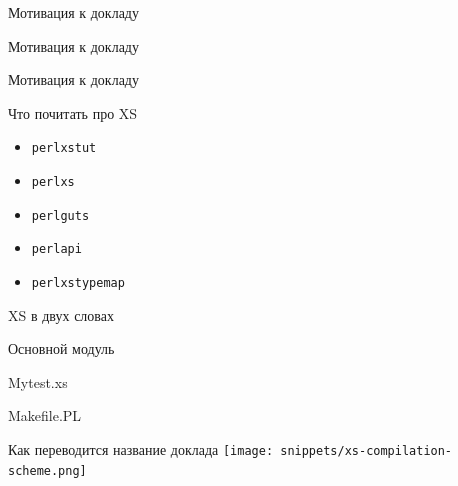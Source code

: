 \begin{frame}[fragile]{Мотивация к докладу}
\end{frame}

\begin{frame}[fragile]{Мотивация к докладу}
\end{frame}

\begin{frame}[fragile]{Мотивация к докладу}
\end{frame}

\begin{frame}[fragile]{Что почитать про XS}
    \begin{itemize}
        \setlength\itemsep{1em}
        \item \texttt{perlxstut}
        \item \texttt{perlxs}
        \item \texttt{perlguts}
        \item \texttt{perlapi}
        \item \texttt{perlxstypemap}
    \end{itemize}
\end{frame}

\begin{frame}[fragile]{XS в двух словах}
\end{frame}

\begin{frame}[fragile]{Основной модуль}
\end{frame}

\begin{frame}[fragile]{Mytest.xs}
\end{frame}

\begin{frame}[fragile]{Makefile.PL}
\end{frame}

\begin{frame}[fragile]{Как переводится название доклада}
    \centering
    \hspace{0.5cm}
    \texttt{[image: snippets/xs-compilation-scheme.png]}
\end{frame}

